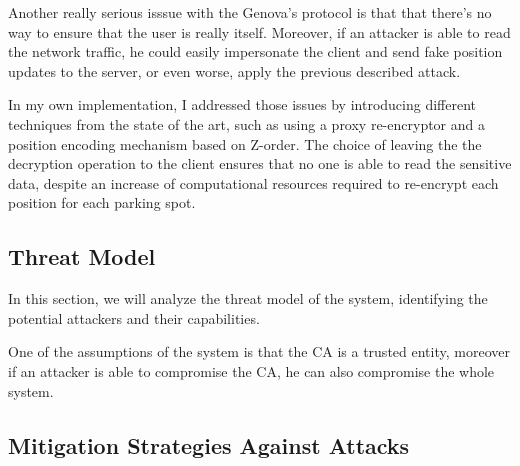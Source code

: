 \documentclass[12pt,a4paper,twoside]{book}
\begin{document}
Another really serious isssue with the Genova's protocol is that that there's no way to ensure that the user is really itself. Moreover, if an attacker is able to read the network traffic, he could easily impersonate the client and send fake position updates to the server, or even worse, apply the previous described attack.

In my own implementation, I addressed those issues by introducing different techniques from the state of the art, such as using a proxy re-encryptor and a position encoding mechanism based on Z-order. The choice of leaving the the decryption operation to the client ensures that no one is able to read the sensitive data, despite an increase of computational resources required to re-encrypt each position for each parking spot.

\subsection{Threat Model}

In this section, we will analyze the threat model of the system, identifying the potential attackers and their capabilities. 

One of the assumptions of the system is that the CA is a trusted entity, moreover if an attacker is able to compromise the CA, he can also compromise the whole system. 

\subsection{Mitigation Strategies Against Attacks}
\end{document}
